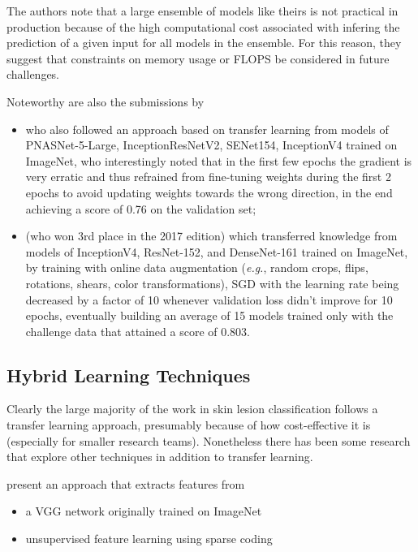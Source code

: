 The authors note that a large ensemble of models like theirs is not practical in production because of the high computational cost associated with infering the prediction of a given input for all models in the ensemble. For this reason, they suggest that constraints on memory usage or \ac{FLOPS} be considered in future challenges.

Noteworthy are also the submissions by

\begin{itemize}
    \item \citeauthor{isic2018milton} \cite{isic2018milton} who also followed an approach based on transfer learning from models of PNASNet-5-Large, InceptionResNetV2, SENet154, InceptionV4 trained on ImageNet, who interestingly noted that in the first few epochs the gradient is very erratic and thus refrained from fine-tuning weights during the first 2 epochs to avoid updating weights towards the wrong direction, in the end achieving a score of 0.76 on the validation set;
    \item \citeauthor{isic2018bissoto} \cite{isic2018bissoto} (who won 3rd place in the 2017 edition) which transferred knowledge from models of InceptionV4, ResNet-152, and DenseNet-161 trained on ImageNet, by training with online data augmentation (\textit{e.g.}, random crops, flips, rotations, shears, color transformations), \ac{SGD} with the learning rate being decreased by a factor of 10 whenever validation loss didn't improve for 10 epochs, eventually building an average of 15 models trained only with the challenge data that attained a score of 0.803.
\end{itemize}

\subsection{Hybrid Learning Techniques}

Clearly the large majority of the work in skin lesion classification follows a transfer learning approach, presumably because of how cost-effective it is (especially for smaller research teams). Nonetheless there has been some research that explore other techniques in addition to transfer learning.

\citeauthor{hybrid2} \cite{hybrid2} present an approach that extracts features from

\begin{itemize}
    \item a \ac{VGG} network originally trained on ImageNet
    \item unsupervised feature learning using sparse coding
\end{itemize}

